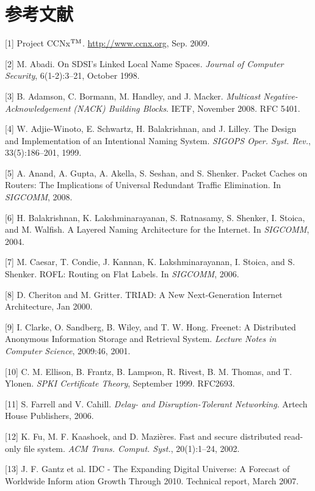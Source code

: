 \section{参考文献}
\def\tm{\leavevmode\hbox{$\rm {}^{TM}$}} %
[1] Project CCNx\tm. \url{http://www.ccnx.org}, Sep. 2009.

[2] M. Abadi. On SDSI’s Linked Local Name Spaces. \emph{Journal of Computer Security}, 6(1-2):3–21, October 1998.

[3] B. Adamson, C. Bormann, M. Handley, and J. Macker.
\emph{Multicast Negative-Acknowledgement (NACK) Building
Blocks}. IETF, November 2008. RFC 5401.

[4] W. Adjie-Winoto, E. Schwartz, H. Balakrishnan, and
J. Lilley. The Design and Implementation of an Intentional Naming System. \emph{SIGOPS Oper. Syst. Rev.}, 33(5):186–201, 1999.

[5] A. Anand, A. Gupta, A. Akella, S. Seshan, and S. Shenker. Packet Caches on Routers: The Implications of Universal Redundant Traffic Elimination. In \emph{SIGCOMM}, 2008.

[6] H. Balakrishnan, K. Lakshminarayanan, S. Ratnasamy, S. Shenker, I. Stoica, and M. Walfish. A Layered Naming Architecture for the Internet. In \emph{SIGCOMM}, 2004.

[7] M. Caesar, T. Condie, J. Kannan, K. Lakshminarayanan,
I. Stoica, and S. Shenker. ROFL: Routing on Flat Labels. In \emph{SIGCOMM}, 2006.

[8] D. Cheriton and M. Gritter. TRIAD: A New Next-Generation Internet Architecture, Jan 2000.

[9] I. Clarke, O. Sandberg, B. Wiley, and T. W. Hong. Freenet: A Distributed Anonymous Information Storage and Retrieval System. \emph{Lecture Notes in Computer Science}, 2009:46, 2001.

[10] C. M. Ellison, B. Frantz, B. Lampson, R. Rivest, B. M. Thomas, and T. Ylonen. \emph{SPKI Certificate Theory}, September 1999. RFC2693.

[11] S. Farrell and V. Cahill. \emph{Delay- and Disruption-Tolerant Networking}. Artech House Publishers, 2006.

[12] K. Fu, M. F. Kaashoek, and D. Mazières. Fast and secure distributed read-only file system. \emph{ACM Trans. Comput. Syst.}, 20(1):1–24, 2002.

[13] J. F. Gantz et al. IDC - The Expanding Digital Universe: A Forecast of Worldwide Inform ation Growth Through 2010. Technical report, March 2007.

